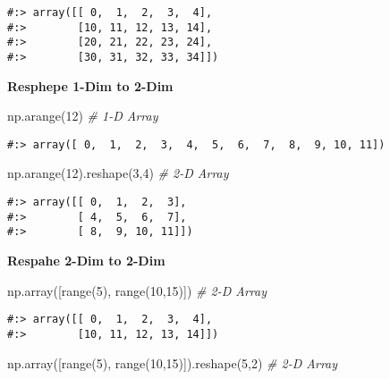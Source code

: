 \documentclass[
]{book}
\newenvironment{Shaded}{\begin{snugshade}}{\end{snugshade}}
\newcommand{\BuiltInTok}[1]{#1}
\newcommand{\CommentTok}[1]{\textcolor[rgb]{0.37,0.37,0.37}{\textit{#1}}}
\newcommand{\DecValTok}[1]{\textcolor[rgb]{0.06,0.06,0.06}{#1}}
\newcommand{\NormalTok}[1]{#1}
\begin{document}
\begin{verbatim}
#:> array([[ 0,  1,  2,  3,  4],
#:>        [10, 11, 12, 13, 14],
#:>        [20, 21, 22, 23, 24],
#:>        [30, 31, 32, 33, 34]])
\end{verbatim}

\textbf{Resphepe 1-Dim to 2-Dim}

\begin{Shaded}
\begin{Highlighting}[]
\NormalTok{np.arange(}\DecValTok{12}\NormalTok{) }\CommentTok{\# 1{-}D Array}
\end{Highlighting}
\end{Shaded}

\begin{verbatim}
#:> array([ 0,  1,  2,  3,  4,  5,  6,  7,  8,  9, 10, 11])
\end{verbatim}

\begin{Shaded}
\begin{Highlighting}[]
\NormalTok{np.arange(}\DecValTok{12}\NormalTok{).reshape(}\DecValTok{3}\NormalTok{,}\DecValTok{4}\NormalTok{)  }\CommentTok{\# 2{-}D Array}
\end{Highlighting}
\end{Shaded}

\begin{verbatim}
#:> array([[ 0,  1,  2,  3],
#:>        [ 4,  5,  6,  7],
#:>        [ 8,  9, 10, 11]])
\end{verbatim}

\textbf{Respahe 2-Dim to 2-Dim}

\begin{Shaded}
\begin{Highlighting}[]
\NormalTok{np.array([}\BuiltInTok{range}\NormalTok{(}\DecValTok{5}\NormalTok{), }\BuiltInTok{range}\NormalTok{(}\DecValTok{10}\NormalTok{,}\DecValTok{15}\NormalTok{)])  }\CommentTok{\# 2{-}D Array}
\end{Highlighting}
\end{Shaded}

\begin{verbatim}
#:> array([[ 0,  1,  2,  3,  4],
#:>        [10, 11, 12, 13, 14]])
\end{verbatim}

\begin{Shaded}
\begin{Highlighting}[]
\NormalTok{np.array([}\BuiltInTok{range}\NormalTok{(}\DecValTok{5}\NormalTok{), }\BuiltInTok{range}\NormalTok{(}\DecValTok{10}\NormalTok{,}\DecValTok{15}\NormalTok{)]).reshape(}\DecValTok{5}\NormalTok{,}\DecValTok{2}\NormalTok{) }\CommentTok{\# 2{-}D Array}
\end{Highlighting}
\end{Shaded}
\end{document}
